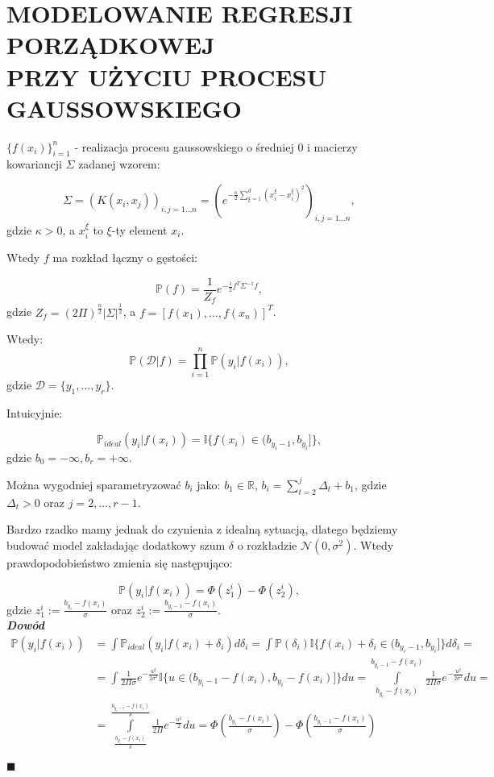 \documentclass[12pt,a4paper]{article}
\newenvironment{dow}{\textbf{\textit{Dowód}}}{\begin{flushright} $\blacksquare$ \end{flushright}}
\begin{document}

\section*{\centering MODELOWANIE REGRESJI PORZĄDKOWEJ \\PRZY UŻYCIU PROCESU GAUSSOWSKIEGO}

$\lbrace f(x_i) \rbrace_{i=1}^{n}$ - realizacja procesu gaussowskiego o średniej $0$ i macierzy kowariancji $\Sigma$ zadanej wzorem:

$$
\Sigma = \left( K(x_i, x_j) \right)_{i, j=1\ldots n} = \left(e^{-\frac{\kappa}{2}\sum_{\xi=1}^{d}(x_i^\xi-x_i^\xi)^2}\right)_{i, j=1\ldots n},
$$
gdzie  $\kappa>0$, a $x_i^\xi$ to $\xi$-ty element $x_i$.

Wtedy $f$ ma rozkład łączny o gęstości:

$$
\mathbb{P}(f)=\frac{1}{Z_f}e^{-\frac{1}{2}f^T\Sigma^{-1}f}, 
$$
gdzie $Z_f=(2\Pi)^{\frac{n}{2}}|\Sigma|^\frac{1}{2}$, a $f=[f(x_1),\ldots,f(x_n)]^T$.

Wtedy:
$$
\mathbb{P}(\mathcal{D}|f) = \prod_{i=1}^n\mathbb{P}(y_i|f(x_i)),
$$
gdzie $\mathcal{D} = \lbrace y_1, \ldots, y_r \rbrace$.

Intuicyjnie:

$$
\mathbb{P}_{ideal} (y_i|f(x_i)) = \mathbb{I}\lbrace f(x_i)\in (b_{y_i-1}, b_{y_i}] \rbrace,
$$
gdzie $b_0=-\infty, b_r=+\infty$. 

Można wygodniej sparametryzować $b_i$ jako: $b_1\in\mathbb{R}$, $b_i = \sum_{t=2}^j\Delta_t+b_1$, gdzie $\Delta_t>0$ oraz $j=2, \ldots, r-1$. 

Bardzo rzadko mamy jednak do czynienia z idealną sytuacją, dlatego będziemy budować model zakładając dodatkowy szum $\delta$ o rozkładzie $\mathcal{N}(0, \sigma^2)$. Wtedy prawdopodobieństwo zmienia się następująco:

$$
\mathbb{P} (y_i|f(x_i)) = \Phi\left( z_1^i \right) - \Phi\left( z_2^i \right),
$$
gdzie $z_1^i :=\frac{b_{y_i}-f(x_i)}{\sigma} $ oraz $z_2^i :=\frac{b_{y_i-1}-f(x_i)}{\sigma} $.
\\

\begin{dow}
\begin{align*}
\mathbb{P} (y_i|f(x_i)) 
&= \int \mathbb{P}_{ideal} (y_i |f(x_i)+\delta_i)d\delta_i = \int \mathbb{P}(\delta_i) \mathbb{I}\lbrace f(x_i)+\delta_i\in (b_{y_i-1}, b_{y_i}] \rbrace d\delta_i =\\
&= \int \frac{1}{2\Pi\sigma}e^{-\frac{u^2}{2\sigma^2}} \mathbb{I}\lbrace u\in (b_{y_i-1}-f(x_i), b_{y_i}-f(x_i)] \rbrace du = \int \limits_{b_{y_i}-f(x_i)}^{b_{y_i-1}-f(x_i)}\frac{1}{2\Pi\sigma}e^{-\frac{u^2}{2\sigma^2}} du =\\
&=  \int \limits_{\frac{b_{y_i}-f(x_i)}{\delta}}^{\frac{b_{y_i-1}-f(x_i)}{\delta}}\frac{1}{2\Pi}e^{-\frac{u^2}{2}} du = \Phi\left( \frac{b_{y_i}-f(x_i)}{\sigma} \right) - \Phi\left( \frac{b_{y_i-1}-f(x_i)}{\sigma} \right)
\end{align*}

\end{dow}
\end{document}
